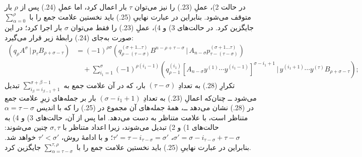 \documentclass[11pt]{article}
\providecommand{\pair}[2]{(#1\,|\,#2)}
\begin{document}
در حالت 2)، عملِ (23.) را نیز می‌توان $\tau$ بار اعمال کرد، اما عملِ (24.) پس از $\rho$ بار متوقف می‌شود. بنابراین در عبارت نهاییِ (25.) باید نخستین علامت جمع را با $\sum_{\alpha=0}^{\rho}$ جایگزین کرد. در حالت‌های 3) و 4)، عملِ (23.) را فقط می‌توان $\sigma$ بار اجرا کرد؛ در این صورت به‌جای (24.) رابطهٔ زیر قرار می‌گیرد:
\begin{equation}
\begin{aligned}
\pair{q_\rho A^\sigma}{p_\tau B_{\rho+\sigma-\tau}}
&=(-1)^{\rho\sigma}
 \pair{q_{\rho-(\tau-\sigma)}^{(\sigma+1\ldots\tau)}B^{n-\rho+\tau-\sigma}}{A_{n-\sigma}p_{\tau-(\tau-\sigma)}^{(\sigma+1\ldots\tau)}}\\
&\quad+\sum_{i_1=1}^{\sigma}(-1)^{\rho(i_1-1)}
 \pair{q_{\rho-1}^{(i_1)}[A_{n-\sigma}y^{(1)}\cdots y^{(i_1-1)}]^{\sigma-i_1+1}}
 {y^{(i_1+1)}\cdots y^{(\tau)}B_{\rho+\sigma-\tau}};
\end{aligned}
\tag{28}
\end{equation}
تکرارِ (28.) به تعدادِ $(\tau-\sigma)$ بار، که در آن علامت جمع به $\sum_{i_\beta=i_{\beta-1}+1}^{\sigma+\beta-1}$ تبدیل می‌شود ــ چنان‌که اعمالِ (23.) به تعدادِ $(\sigma-i_1+1)$ بار بر جمله‌های زیرِ علامت جمع در (28.) نشان می‌دهد ــ، همهٔ جمله‌های آن مجموع در (25.) را که با اندیس $\alpha=\tau-\sigma$ متناظر است، با علامت متناظر به دست می‌دهد. اما پس از آن، حالت‌های 3) و 4) به حالت‌های 1) و 2) تبدیل می‌شوند، زیرا اعداد متناظر با $\sigma,\tau$ چنین می‌شوند: $\sigma'=\sigma-i_{\tau-\sigma}+\tau-\sigma$، $\tau'=\tau-i_{\tau-\sigma}=\sigma'$؛ و با ادامهٔ روش، $\tau'<\sigma'$ خواهد شد. بنابراین در عبارت نهاییِ (25.) باید نخستین علامت جمع را با $\sum_{\alpha=\tau-\sigma}^{\tau,\rho}$ جایگزین کرد.
\end{document}
